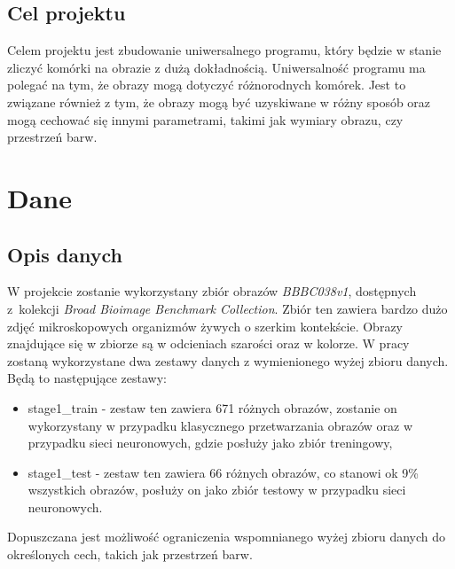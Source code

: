 \documentclass[a4paper]{article}
\begin{document}
\subsection{Cel projektu}
Celem projektu jest zbudowanie uniwersalnego programu, który będzie w stanie zliczyć komórki na obrazie z dużą dokładnością. Uniwersalność programu ma polegać na tym, że obrazy mogą dotyczyć różnorodnych komórek. Jest to związane również z tym, że obrazy mogą być uzyskiwane w różny sposób oraz mogą cechować się innymi parametrami, takimi jak wymiary obrazu, czy przestrzeń barw.
\section{Dane}
\subsection{Opis danych}
W projekcie zostanie wykorzystany zbiór obrazów \textit{BBBC038v1}, dostępnych z~kolekcji \textit{Broad Bioimage Benchmark Collection}. Zbiór ten zawiera bardzo dużo zdjęć mikroskopowych organizmów żywych o szerkim kontekście. Obrazy znajdujące się w zbiorze są w odcieniach szarości oraz w kolorze. W pracy zostaną wykorzystane dwa zestawy danych z wymienionego wyżej zbioru danych. Będą to następujące zestawy:
\begin{itemize}
    \item stage1\_train - zestaw ten zawiera 671 różnych obrazów, zostanie on wykorzystany w przypadku klasycznego przetwarzania obrazów oraz w przypadku sieci neuronowych, gdzie posłuży jako zbiór treningowy,
    \item stage1\_test - zestaw ten zawiera 66 różnych obrazów, co stanowi ok 9\% wszystkich obrazów, posłuży on jako zbiór testowy w przypadku sieci neuronowych.
\end{itemize}
Dopuszczana jest możliwość ograniczenia wspomnianego wyżej zbioru danych do określonych cech, takich jak przestrzeń barw.
\end{document}
